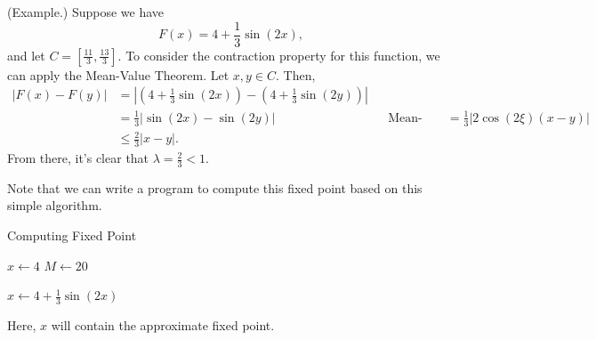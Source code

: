\documentclass[letterpaper]{article}
\begin{document}
\begin{mdframed}
    (Example.) Suppose we have \[F(x) = 4 + \frac{1}{3}\sin(2x),\] and let $C = \left[\frac{11}{3}, \frac{13}{3}\right].$ To consider the contraction property for this function, we can apply the Mean-Value Theorem. Let $x, y \in C$. Then, 
    \[\begin{aligned}
        |F(x) - F(y)| &= \left|\left(4 + \frac{1}{3}\sin(2x)\right) - \left(4 + \frac{1}{3}\sin(2y)\right)\right| \\ 
            &= \frac{1}{3}|\sin(2x) - \sin(2y)| && \text{Mean-Value Theorem}
            &= \frac{1}{3}|2\cos(2\xi)(x - y)| \\ 
            &\leq \frac{2}{3}\left|x - y\right|.
    \end{aligned}\]
    From there, it's clear that $\lambda = \frac{2}{3} < 1$. 

    \bigskip 

    Note that we can write a program to compute this fixed point based on this simple algorithm. 
    \begin{algorithm}[H]
        \caption{Computing Fixed Point}
        \label{alg:two}
        \begin{algorithmic}[1]
            \State $x \gets 4$
            \State $M \gets 20$

                \State $x \gets 4 + \frac{1}{3}\sin(2x)$
            \EndFor 
        \end{algorithmic}
    \end{algorithm}
    Here, $x$ will contain the approximate fixed point.
\end{mdframed}
\end{document}
